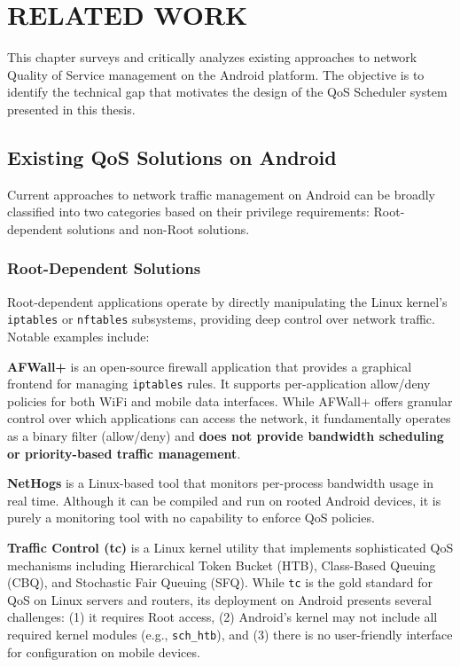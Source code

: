 
\chapter{RELATED WORK}
\label{chap:relatedwork}

This chapter surveys and critically analyzes existing approaches to network Quality of Service management on the Android platform. The objective is to identify the technical gap that motivates the design of the QoS Scheduler system presented in this thesis.

\section{Existing QoS Solutions on Android}
\label{sec:existing_solutions}

Current approaches to network traffic management on Android can be broadly classified into two categories based on their privilege requirements: Root-dependent solutions and non-Root solutions.

\subsection{Root-Dependent Solutions}

Root-dependent applications operate by directly manipulating the Linux kernel's \texttt{iptables} or \texttt{nftables} subsystems, providing deep control over network traffic. Notable examples include:

\textbf{AFWall+} \cite{afwall} is an open-source firewall application that provides a graphical frontend for managing \texttt{iptables} rules. It supports per-application allow/deny policies for both WiFi and mobile data interfaces. While AFWall+ offers granular control over which applications can access the network, it fundamentally operates as a binary filter (allow/deny) and \textbf{does not provide bandwidth scheduling or priority-based traffic management}.

\textbf{NetHogs} \cite{nethogs} is a Linux-based tool that monitors per-process bandwidth usage in real time. Although it can be compiled and run on rooted Android devices, it is purely a monitoring tool with no capability to enforce QoS policies.

\textbf{Traffic Control (tc)} is a Linux kernel utility that implements sophisticated QoS mechanisms including Hierarchical Token Bucket (HTB), Class-Based Queuing (CBQ), and Stochastic Fair Queuing (SFQ). While \texttt{tc} is the gold standard for QoS on Linux servers and routers, its deployment on Android presents several challenges: (1) it requires Root access, (2) Android's kernel may not include all required kernel modules (e.g., \texttt{sch\_htb}), and (3) there is no user-friendly interface for configuration on mobile devices.

